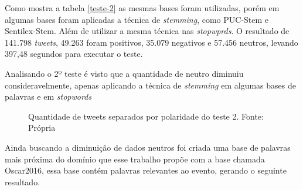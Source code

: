 Como mostra a tabela \ref{teste-2} as mesmas bases foram utilizadas, porém em algumas bases foram aplicadas a técnica de \textit{stemming}, como  PUC-Stem e Sentilex-Stem. Além de utilizar a mesma técnica nas  \textit{stopwprds}. O resultado de 141.798 \textit{tweets}, 49.263 foram positivos, 35.079 negativos e 57.456 neutros, levando 397,48 segundos para executar o teste.
\begin{table}[]
	\caption{2º teste}
	\label{teste-2}
\end{table}

Analisando o 2º teste é visto que a quantidade de neutro diminuiu consideravelmente, apenas aplicando a técnica de \textit{stemming} em algumas bases de palavras e em \textit{stopwords}
\begin{figure}[!h]
	\centering{}
	\caption{Quantidade de tweets separados por polaridade do teste 2. Fonte: Própria}
	\label{teste-graf-2}
\end{figure}

Ainda buscando a diminuição de dados neutros foi criada uma base de palavras mais próxima do domínio que esse trabalho propõe com a base chamada Oscar2016, essa base contém palavras relevantes ao evento, gerando o seguinte resultado.

